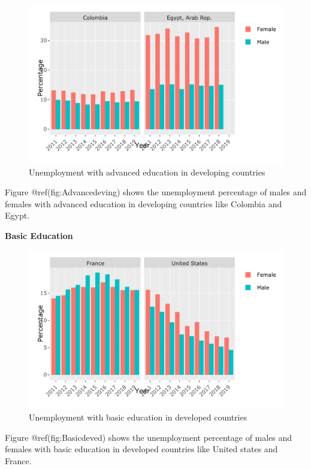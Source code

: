 \documentclass[
]{article}
\begin{document}
\begin{figure}
\centering
\includegraphics{The_Outsiders_5513_files/figure-latex/Advancedeving-1.pdf}
\caption{Unemployment with advanced education in developing countries}
\end{figure}

Figure @ref(fig:Advancedeving) shows the unemployment percentage of
males and females with advanced education in developing countries like
Colombia and Egypt.

\textbf{Basic Education}

\begin{figure}
\centering
\includegraphics{The_Outsiders_5513_files/figure-latex/Basicdeved-1.pdf}
\caption{Unemployment with basic education in developed countries}
\end{figure}

Figure @ref(fig:Basicdeved) shows the unemployment percentage of males
and females with basic education in developed countries like United
states and France.
\end{document}
